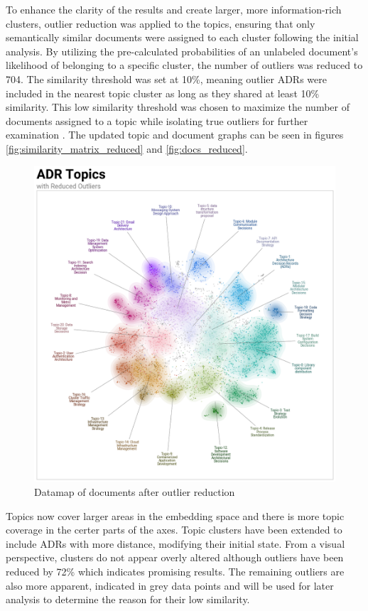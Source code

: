         To enhance the clarity of the results and create larger, more information-rich clusters, outlier reduction was applied to the topics, ensuring that only semantically similar documents were assigned to each cluster following the initial analysis. By utilizing the pre-calculated probabilities of an unlabeled document's likelihood of belonging to a specific cluster, the number of outliers was reduced to 704. The similarity threshold was set at 10\%, meaning outlier ADRs were included in the nearest topic cluster as long as they shared at least 10\% similarity. This low similarity threshold was chosen to maximize the number of documents assigned to a topic while isolating true outliers for further examination . The updated topic and document graphs can be seen in figures \ref{fig:similarity_matrix_reduced} and \ref{fig:docs_reduced}. 
        
        \begin{figure}[ht]
            \centering
            \includegraphics[scale=0.4]{figures/BerTopic_Reduced/datamap_reduced_outliers.png}
            \caption{Datamap of documents after outlier reduction}
            \label{fig:datamap_reduced}
        \end{figure}
        
        Topics now cover larger areas in the embedding space and there is more topic coverage in the certer parts of the axes. Topic clusters have been extended to include ADRs with more distance, modifying their initial state. From a visual perspective, clusters do not appear overly altered although outliers have been reduced by 72\% which indicates promising results. The remaining outliers are also more apparent, indicated in grey data points and will be used for later analysis to determine the reason for their low similarity.

